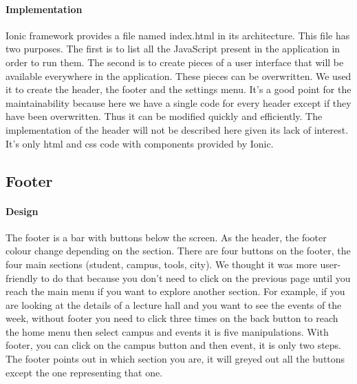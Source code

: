 \documentclass[11pt, a4paper]{report}
\begin{document}
\paragraph{Implementation}
Ionic framework provides a file named index.html in its architecture. This file has two purposes. The first is to list all the JavaScript present in the application in order to run them. The second is to create pieces of a user interface that will be available everywhere in the application. These pieces can be overwritten. We used it to create the header, the footer and the settings menu. It's a good point for the maintainability because here we have a single code for every header except if they have been overwritten. Thus it can be modified quickly and efficiently. The implementation of the header will not be described here given its lack of interest. It's only html and css code with components provided by Ionic.
\subsection{Footer}
\paragraph{Design}
The footer is a bar with buttons below the screen. As the header, the footer colour change depending on the section. There are four buttons on the footer, the four main sections (student, campus, tools, city). We thought it was more user-friendly to do that because you don't need to click on the previous page until you reach the main menu if you want to explore another section. For example, if you are looking at the details of a lecture hall and you want to see the events of the week, without footer you need to click three times on the back button to reach the home menu then select campus and events it is five manipulations. With footer, you can click on the campus button and then event, it is only two steps. The footer points out in which section you are, it will greyed out all the buttons except the one representing that one.
\end{document}
